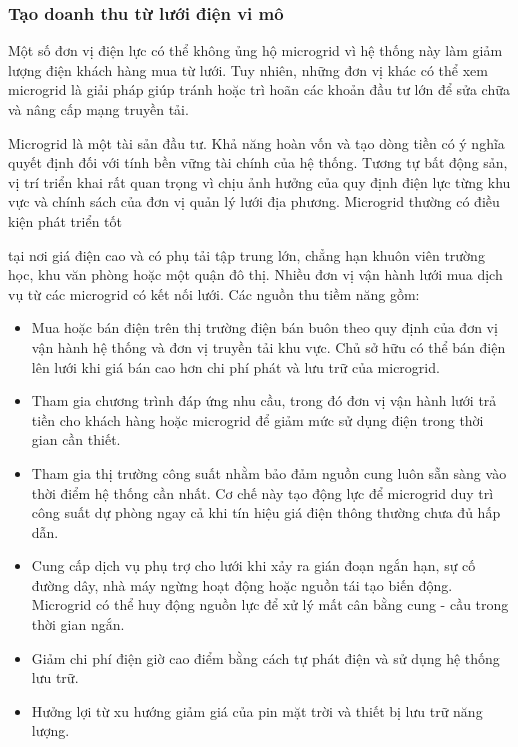 \documentclass{thesis}
\begin{document}
\subsubsection{Tạo doanh thu từ lưới điện vi mô}

Một số đơn vị điện lực có thể không ủng hộ microgrid vì hệ thống này
làm giảm lượng điện khách hàng mua từ lưới. Tuy nhiên, những đơn vị
khác có thể xem microgrid là giải pháp giúp tránh hoặc trì hoãn các
khoản đầu tư lớn để sửa chữa và nâng cấp mạng truyền tải.

Microgrid là một tài sản đầu tư. Khả năng hoàn vốn và tạo dòng tiền
có ý nghĩa quyết định đối với tính bền vững tài chính của hệ thống.
Tương tự bất động sản, vị trí triển khai rất quan trọng vì chịu ảnh
hưởng của quy định điện lực từng khu vực và chính sách của đơn vị
quản lý lưới địa phương. Microgrid thường có điều kiện phát triển tốt

tại nơi giá điện cao và có phụ tải tập trung lớn, chẳng hạn khuôn
viên trường học, khu văn phòng hoặc một quận đô thị.
Nhiều đơn vị vận hành lưới mua dịch vụ từ các microgrid có kết nối
lưới. Các nguồn thu tiềm năng gồm:

\begin{itemize}
  \item Mua hoặc bán điện trên thị trường điện bán buôn theo quy định
    của đơn vị vận hành hệ thống và đơn vị truyền tải khu vực. Chủ sở
    hữu có thể bán điện lên lưới khi giá bán cao hơn chi phí phát và
    lưu trữ của microgrid.

  \item Tham gia chương trình đáp ứng nhu cầu, trong đó đơn vị vận
    hành lưới trả tiền cho khách hàng hoặc microgrid để giảm mức sử
    dụng điện trong thời gian cần thiết.

  \item Tham gia thị trường công suất nhằm bảo đảm nguồn cung luôn
    sẵn sàng vào thời điểm hệ thống cần nhất. Cơ chế này tạo động lực
    để microgrid duy trì công suất dự phòng ngay cả khi tín hiệu giá
    điện thông thường chưa đủ hấp dẫn.

  \item Cung cấp dịch vụ phụ trợ cho lưới khi xảy ra gián đoạn ngắn
    hạn, sự cố đường dây, nhà máy ngừng hoạt động hoặc nguồn tái tạo
    biến động. Microgrid có thể huy động nguồn lực để xử lý mất cân
    bằng cung - cầu trong thời gian ngắn.

  \item Giảm chi phí điện giờ cao điểm bằng cách tự phát điện và sử
    dụng hệ thống lưu trữ.

  \item Hưởng lợi từ xu hướng giảm giá của pin mặt trời và thiết bị
    lưu trữ năng lượng.
\end{itemize}
\end{document}
